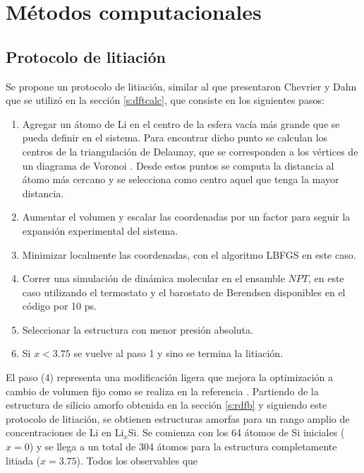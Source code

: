 \section{Métodos computacionales}

\subsection{Protocolo de litiación}\label{s:litpro}

Se propone un protocolo de litiación, similar al que presentaron Chevrier y Dahn
\cite{chevrier2009} que se utilizó en la sección \ref{s:dftcalc}, que consiste 
en los siguientes pasos:
\begin{enumerate}
    \item Agregar un átomo de Li en el centro de la esfera vacía más grande que se pueda definir en el sistema.
        Para encontrar dicho punto se calculan los centros de la triangulación 
        de Delaunay, que se corresponden a los vértices de un diagrama de 
        Voronoi \cite{aurenhammer1991}. Desde estos puntos se computa la 
        distancia al átomo más cercano y se selecciona como centro aquel que 
        tenga la mayor distancia. 
    \item Aumentar  el volumen y escalar las coordenadas por un factor para
        seguir la expansión experimental del sistema.
    \item Minimizar localmente las coordenadas, con el algoritmo LBFGS \cite{liu1989} en este caso.
    \item Correr una simulación de dinámica molecular en el ensamble $NPT$, en 
        este caso utilizando el termostato y el barostato de Berendsen \cite{berendsen1984} 
        disponibles en el código  \cite{dftb+} por 10 ps. 
    \item Seleccionar la estructura con menor presión absoluta.
    \item Si $x < 3.75$ se vuelve al paso 1 y sino se termina la litiación.
\end{enumerate}
El paso (4) representa una modificación ligera que mejora la optimización a 
cambio de volumen fijo como se realiza en la referencia \cite{chevrier2009}.
Partiendo de la estructura de silicio amorfo obtenida en la sección 
\ref{s:rdfb} y siguiendo este protocolo de litiación, se obtienen estructuras
amorfas para un rango amplio de concentraciones de Li en Li$_x$Si. Se comienza
con los 64 átomos de Si iniciales ($x=0$) y se llega a un total de 304 átomos
para la estructura completamente litiada ($x=3.75$). Todos los observables que
